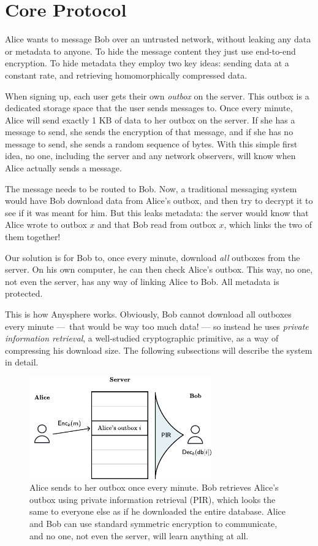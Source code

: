 \section{Core Protocol}
\label{sec:coreprotocol}

Alice wants to message Bob over an untrusted network, without leaking any data or metadata to anyone. To hide the message content they just use end-to-end encryption. To hide metadata they employ two key ideas: sending data at a constant rate, and retrieving homomorphically compressed data.

When signing up, each user gets their own \textit{outbox} on the server. This outbox is a dedicated storage space that the user sends messages to. Once every minute, Alice will send exactly 1 KB of data to her outbox on the server. If she has a message to send, she sends the encryption of that message, and if she has no message to send, she sends a random sequence of bytes. With this simple first idea, no one, including the server and any network observers, will know when Alice actually sends a message.

The message needs to be routed to Bob. Now, a traditional messaging system would have Bob download data from Alice's outbox, and then try to decrypt it to see if it was meant for him. But this leaks metadata: the server would know that Alice wrote to outbox $x$ and that Bob read from outbox $x$, which links the two of them together!

Our solution is for Bob to, once every minute, download \textit{all} outboxes from the server. On his own computer, he can then check Alice's outbox. This way, no one, not even the server, has any way of linking Alice to Bob. All metadata is protected.

This is how Anysphere works. Obviously, Bob cannot download all outboxes every minute — that would be way too much data! — so instead he uses \textit{private information retrieval}, a well-studied cryptographic primitive, as a way of compressing his download size. The following subsections will describe the system in detail.

\begin{figure}
    \centering
    \includegraphics[width=0.7\textwidth]{pirfigure.pdf}
\caption{Alice sends to her outbox once every minute. Bob retrieves Alice's outbox using private information retrieval (PIR), which looks the same to everyone else as if he downloaded the entire database. Alice and Bob can use standard symmetric encryption to communicate, and no one, not even the server, will learn anything at all.}
\end{figure}



